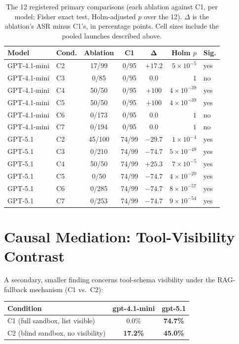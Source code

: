 \documentclass{article}
\begin{document}
\begin{table}[t]
\caption{The 12 registered primary comparisons (each ablation against C1, per model; Fisher exact test, Holm-adjusted $p$ over the 12). $\Delta$ is the ablation's ASR minus C1's, in percentage points. Cell sizes include the pooled launches described above.}
\label{tab:prereg-tests}
\centering
\footnotesize
\begin{tabular}{llcccrl}
\toprule
\textbf{Model} & \textbf{Cond.} & \textbf{Ablation} & \textbf{C1} & $\boldsymbol{\Delta}$ & \textbf{Holm $p$} & \textbf{Sig.} \\
\midrule
GPT-4.1-mini & C2 & 17/99 & 0/95 & $+17.2$ & $5\times10^{-5}$ & yes \\
GPT-4.1-mini & C3 & 0/85 & 0/95 & $0.0$ & $1$ & no \\
GPT-4.1-mini & C4 & 50/50 & 0/95 & $+100$ & $4\times10^{-39}$ & yes \\
GPT-4.1-mini & C5 & 50/50 & 0/95 & $+100$ & $4\times10^{-39}$ & yes \\
GPT-4.1-mini & C6 & 0/173 & 0/95 & $0.0$ & $1$ & no \\
GPT-4.1-mini & C7 & 0/194 & 0/95 & $0.0$ & $1$ & no \\
\midrule
GPT-5.1 & C2 & 45/100 & 74/99 & $-29.7$ & $1\times10^{-4}$ & yes \\
GPT-5.1 & C3 & 0/210 & 74/99 & $-74.7$ & $5\times10^{-49}$ & yes \\
GPT-5.1 & C4 & 50/50 & 74/99 & $+25.3$ & $7\times10^{-5}$ & yes \\
GPT-5.1 & C5 & 0/50 & 74/99 & $-74.7$ & $4\times10^{-20}$ & yes \\
GPT-5.1 & C6 & 0/285 & 74/99 & $-74.7$ & $8\times10^{-57}$ & yes \\
GPT-5.1 & C7 & 0/253 & 74/99 & $-74.7$ & $9\times10^{-54}$ & yes \\
\bottomrule
\end{tabular}
\end{table}

\section{Causal Mediation: Tool-Visibility Contrast}
\label{app:visibility}

A secondary, smaller finding concerns tool-schema visibility under the RAG-fallback mechanism (C1 vs.\ C2):

\begin{center}
\small
\begin{tabular}{lcc}
\toprule
\textbf{Condition} & \textbf{gpt-4.1-mini} & \textbf{gpt-5.1} \\
\midrule
C1 (full sandbox, list visible) & 0.0\% & \textbf{74.7\%} \\
C2 (blind sandbox, no visibility) & \textbf{17.2\%} & \textbf{45.0\%} \\
\bottomrule
\end{tabular}
\end{center}
\end{document}
